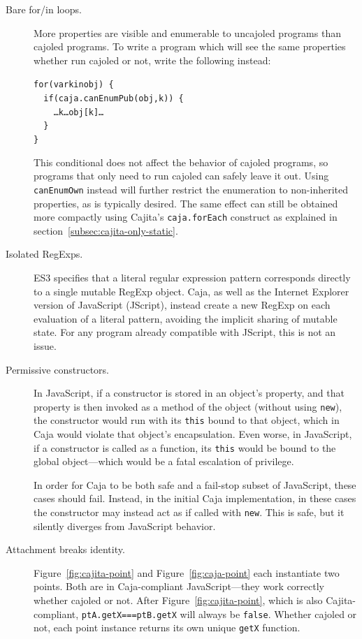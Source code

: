 \documentclass[letterpaper,twocolumn,10pt]{article}
\newcommand{\code}[1]{{\tt {#1}}}              %
\begin{document}
\begin{description}

  \item[Bare for/in loops.] More properties are visible and enumerable to 
  uncajoled programs than cajoled programs. To write a program which 
  will see the same properties whether run cajoled or not, write the 
  following instead:
%
\begin{alltt}
for (var k in obj)\ \{ 
\ \ if (caja.canEnumPub(obj,k))\ \{
\ \ \ \ {\ldots}k{\ldots}obj[k]\ldots
\ \ \}
\}
\end{alltt}
%
  This conditional does not affect the behavior of cajoled programs, so
  programs that only need to run cajoled can safely leave it out. Using
  \code{canEnumOwn} instead will further restrict the enumeration to
  non-inherited properties, as is typically desired. The same effect can still
  be obtained more compactly using Cajita's \code{caja.forEach} construct as
  explained in section~\ref{subsec:cajita-only-static}.

  \item[Isolated RegExps.] ES3 specifies that a literal regular expression 
  pattern corresponds directly to a single mutable RegExp object. Caja, as 
  well as the Internet Explorer version of JavaScript (JScript), instead 
  create a new RegExp on each evaluation of a literal pattern, avoiding the 
  implicit sharing of mutable state. For any program already compatible with 
  JScript, this is not an issue.
  
  \item[Permissive constructors.] In JavaScript, if a constructor is stored in an 
  object's property, and that property is then invoked as a method of 
  the object (without using \code{new}), the constructor would run with its 
  \code{this} bound to that object, which in Caja would violate that object's 
  encapsulation. Even worse, in JavaScript, if a constructor is called 
  as a function, its \code{this} would be bound to the global 
  object---which would be a fatal escalation of privilege.
  
  In order for Caja to be both safe and a fail-stop subset of JavaScript, 
  these cases should fail. Instead, in the initial Caja implementation, in 
  these cases the constructor may instead act as if called with \code{new}. 
  This is safe, but it silently diverges from JavaScript behavior.
  
  \item[Attachment breaks identity.] Figure~\ref{fig:cajita-point} and 
  Figure~\ref{fig:caja-point} each instantiate two points. Both are in 
  Caja-compliant JavaScript---they work correctly whether cajoled or not. 
  After Figure~\ref{fig:cajita-point}, which is also Cajita-compliant, 
  \code{ptA.getX===ptB.getX} will always be \code{false}. Whether cajoled or 
  not, each point instance returns its own unique \code{getX} function.
  

\end{description}
\end{document}
